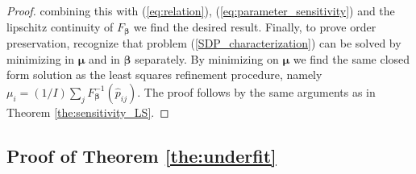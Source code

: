 \documentclass[twoside,11pt]{article}
\begin{document}
\begin{proof}
combining this with (\ref{eq:relation}), (\ref{eq:parameter_sensitivity}) and the lipschitz continuity of $F_{\boldsymbol{\beta}}$ we find the desired result. Finally, to prove order preservation, recognize that problem (\ref{SDP_characterization}) can be solved by minimizing in $\boldsymbol{\mu}$ and in $\boldsymbol{\beta}$  separately. By minimizing on $\boldsymbol{\mu}$ we find the same closed form solution as the least squares refinement procedure, namely $\mu_i = (1/I)\sum_j F_{\boldsymbol{\beta}}^{-1}(\hat{p}_{ij})$. The proof follows by the same arguments as in Theorem \ref{the:sensitivity_LS}.
\end{proof}



\subsection{Proof of Theorem \ref{the:underfit}}
\label{sec:proof_the_underfit}
\end{document}
